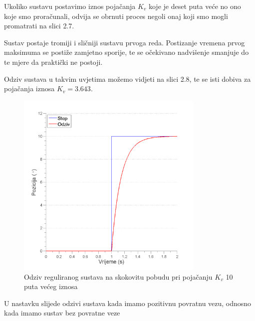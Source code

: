 \documentclass[12pt,a4paper]{article}
\begin{document}
\newpage

Ukoliko sustavu postavimo iznos pojačanja $K_v$ koje je deset puta veće no ono koje smo proračunali, odvija se obrnuti proces negoli onaj koji smo mogli promatrati na slici 2.7.

Sustav postaje tromiji i sličniji sustavu prvoga reda. Postizanje vremena prvog maksimuma se postiže zamjetno sporije, te se očekivano nadvišenje smanjuje do te mjere da praktički ne postoji.

Odziv sustava u takvim uvjetima možemo vidjeti na slici 2.8, te se isti dobiva za  pojačanja iznosa $K_v = 3.643$.

\begin{figure}[h]
	\begin{center}
	\includegraphics[width=0.8\textwidth] {odziv_3.png}
    \caption{Odziv reguliranog sustava na skokovitu pobudu pri pojačanju $K_v$ 10 puta većeg iznosa }
    \end{center}
\end{figure}


U nastavku slijede odzivi sustava kada imamo pozitivnu povratnu vezu, odnosno kada imamo sustav bez povratne veze

\newpage
\end{document}
